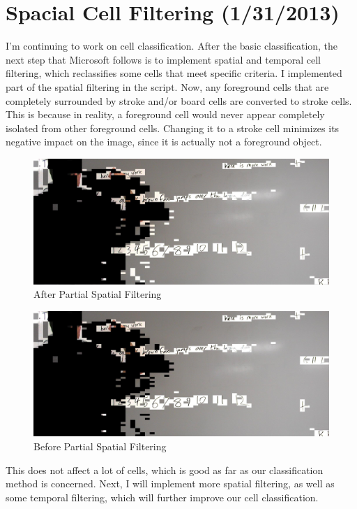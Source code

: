 \documentclass[]{article}
\begin{document}
	\section{Spacial Cell Filtering (1/31/2013)}	
		I'm continuing to work on cell classification.  After the basic classification, the next step that Microsoft follows is to implement spatial and temporal cell filtering, which reclassifies some cells that meet specific criteria.  I implemented part of the spatial filtering in the script.  Now, any foreground cells that are completely surrounded by stroke and/or board cells are converted to stroke cells.  This is because in reality, a foreground cell would never appear completely isolated from other foreground cells.  Changing it to a stroke cell minimizes its negative impact on the image, since it is actually not a foreground object.  
\begin{figure}[H]
\centering
\includegraphics[scale=0.2]{images/afterSpatial1}
\caption{After Partial Spatial Filtering}
\end{figure}
		
\begin{figure}[H]
\centering
\includegraphics[scale=0.2]{images/beforeSpatial1}
\caption{Before Partial Spatial Filtering}
\end{figure}	
This does not affect a lot of cells, which is good as far as our classification method is concerned.  Next, I will implement more spatial filtering, as well as some temporal filtering, which will further improve our cell classification.
\end{document}
